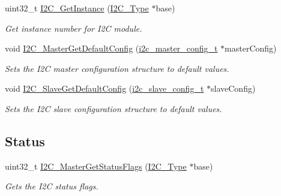 \begin{DoxyCompactItemize}
uint32\+\_\+t \mbox{\hyperlink{group__i2c__driver_ga07cc6bd20f700249c335893427bf462a}{I2\+C\+\_\+\+Get\+Instance}} (\mbox{\hyperlink{struct_i2_c___type}{I2\+C\+\_\+\+Type}} $\ast$base)
\begin{DoxyCompactList}\small\item\em Get instance number for I2C module. \end{DoxyCompactList}\item 
void \mbox{\hyperlink{group__i2c__driver_gad69f2d63ea756dda60749ff6b09f587d}{I2\+C\+\_\+\+Master\+Get\+Default\+Config}} (\mbox{\hyperlink{group__i2c__driver_gad739710b6b65e12ca5ba9dc2a2a2b463}{i2c\+\_\+master\+\_\+config\+\_\+t}} $\ast$master\+Config)
\begin{DoxyCompactList}\small\item\em Sets the I2C master configuration structure to default values. \end{DoxyCompactList}\item 
void \mbox{\hyperlink{group__i2c__driver_ga7115f80e28b62bbbd3be1a2a918529ba}{I2\+C\+\_\+\+Slave\+Get\+Default\+Config}} (\mbox{\hyperlink{group__i2c__driver_gaa70dd0ec9815617269569190efd2de5d}{i2c\+\_\+slave\+\_\+config\+\_\+t}} $\ast$slave\+Config)
\begin{DoxyCompactList}\small\item\em Sets the I2C slave configuration structure to default values. \end{DoxyCompactList}\end{DoxyCompactItemize}
\subsection*{Status}
\begin{DoxyCompactItemize}
\item 
uint32\+\_\+t \mbox{\hyperlink{group__i2c__driver_ga721e41295dedc83b424e80e53065e625}{I2\+C\+\_\+\+Master\+Get\+Status\+Flags}} (\mbox{\hyperlink{struct_i2_c___type}{I2\+C\+\_\+\+Type}} $\ast$base)
\begin{DoxyCompactList}\small\item\em Gets the I2C status flags. \end{DoxyCompactList}\end{DoxyCompactItemize}

